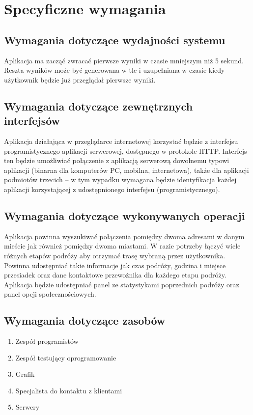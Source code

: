 \documentclass[12pt,a4paper]{report}
\begin{document}
\section{Specyficzne wymagania}
\subsection{Wymagania dotyczące wydajności systemu}
	Aplikacja ma zacząć zwracać pierwsze wyniki w czasie mniejszym niż 5 sekund. Reszta wyników może być generowana w tle i uzupełniana w czasie kiedy użytkownik będzie już przeglądał pierwsze wyniki.
\subsection{Wymagania dotyczące zewnętrznych interfejsów}
Aplikacja działająca w przeglądarce internetowej korzystać będzie z interfejsu programistycznego aplikacji serwerowej, dostępnego w protokole HTTP. Interfejs ten będzie umożliwiać połączenie z aplikacją serwerową dowolnemu typowi aplikacji (binarna dla komputerów PC, mobilna, internetowa), także dla aplikacji podmiotów trzecich -- w tym wypadku wymagana będzie identyfikacja każdej aplikacji korzystającej z udostępnionego interfejsu (programistycznego).
\subsection{Wymagania dotyczące wykonywanych operacji}
	Aplikacja powinna wyszukiwać połączenia pomiędzy dwoma adresami w danym mieście jak również pomiędzy dwoma miastami. W razie potrzeby łączyć wiele różnych etapów podróży aby otrzymać trasę wybraną przez użytkownika. Powinna udostępniać takie informacje jak czas podróży, godzina i miejsce przesiadek oraz dane kontaktowe przewoźnika dla każdego etapu podróży. Aplikacja będzie udostępniać panel ze statystykami poprzednich podróży oraz panel opcji społecznościowych.
\subsection{Wymagania dotyczące zasobów}
\begin{enumerate}
	\item Zespół programistów
	\item Zespół testujący oprogramowanie
	\item Grafik
	\item Specjalista do kontaktu z klientami
	\item Serwery
\end{enumerate}
\newpage
\end{document}
